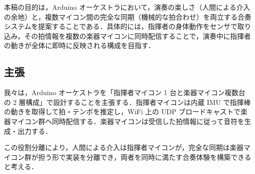 本稿の目的は，Arduino オーケストラにおいて，演奏の楽しさ（人間による介入の余地）と，複数マイコン間の完全な同期（機械的な拍合わせ）を両立する合奏システムを提案することである．具体的には，指揮者の身体動作をセンサで取り込み，その拍情報を複数の楽器マイコンに同時配信することで，演奏中に指揮者の動きが全体に即時に反映される構成を目指す．

\subsection{主張}
\label{subsec:claim}

我々は，Arduino オーケストラを「指揮者マイコン 1 台と楽器マイコン複数台の 2 層構成」で設計することを主張する．指揮者マイコンは内蔵 IMU で指揮棒の動きを取得して拍・テンポを推定し，WiFi 上の UDP ブロードキャストで楽器マイコン群へ同時配信する．楽器マイコンは受信した拍情報に従って音符を生成・出力する．

この役割分離により，人間による介入は指揮者マイコンが，完全な同期は楽器マイコン群が担う形で実装を分離でき，両者を同時に満たす合奏体験を構築できると考える．
